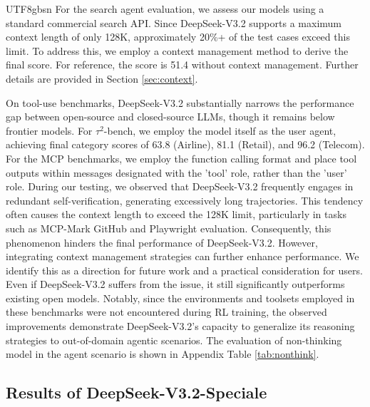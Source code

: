 \documentclass[11pt, a4paper, logo, copyright, nonumbering]{deepseek}
\def\newmodel{DeepSeek-V3.2}
\def\highmodel{DeepSeek-V3.2-Speciale}
\begin{document}
\begin{CJK*}{UTF8}{gbsn}
For the search agent evaluation, we assess our models using a standard commercial search API. Since \newmodel{} supports a maximum context length of only 128K, approximately 20\%+ of the test cases exceed this limit. To address this, we employ a context management method to derive the final score. For reference, the score is 51.4 without context management. Further details are provided in Section \ref{sec:context}.

On tool-use benchmarks, \newmodel{} substantially narrows the performance gap between open-source and closed-source LLMs, though it remains below frontier models. For $\tau^2$-bench, we employ the model itself as the user agent, achieving final category scores of 63.8 (Airline), 81.1 (Retail), and 96.2 (Telecom). For the MCP benchmarks, we employ the function calling format and place tool outputs within messages designated with the 'tool' role, rather than the 'user' role.
During our testing, we observed that \newmodel{} frequently engages in redundant self-verification, generating excessively long trajectories. This tendency often causes the context length to exceed the 128K limit, particularly in tasks such as MCP-Mark GitHub and Playwright evaluation. Consequently, this phenomenon hinders the final performance of \newmodel{}. However, integrating context management strategies can further enhance performance. We identify this as a direction for future work and a practical consideration for users. Even if \newmodel{} suffers from the issue, it still significantly outperforms existing open models. 
Notably, since the environments and toolsets employed in these benchmarks were not encountered during RL training, the observed improvements demonstrate \newmodel's capacity to generalize its reasoning strategies to out-of-domain agentic scenarios. The evaluation of non-thinking model in the agent scenario is shown in Appendix Table \ref{tab:nonthink}.  

\subsection{Results of \highmodel{}}
\label{longoutput}


\end{CJK*}
\end{document}
